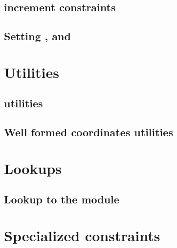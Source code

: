 \subsection{\blsId{} increment constraints}                                 \label{bls: stamp increments}                                        

\subsection{Setting \malformedDataBit, \malformedDataAcc{} and \malformedDataExternalJustification}     \label{bls: malformed bit acc justification}                    

\section{Utilities}                                                                                                                             
\subsection{\wcpMod{} utilities}                                            \label{bls: wcp utilities}                                           
\subsection{Well formed coordinates utilities}                              \label{bls: well formed coordinates utilities}                       
     
\section{Lookups}     
\subsection{Lookup to the \wcpMod{} module}                                 \label{bls: lookups: wcp}                                            
     
\section{Specialized constraints}                                           \label{bls: specialized constraints}                                 
       
